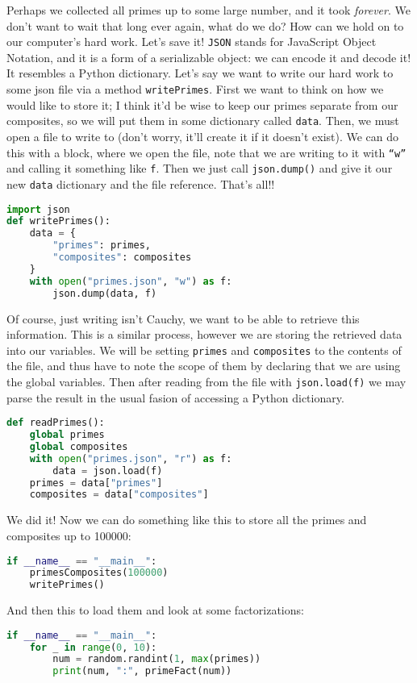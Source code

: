 \documentclass[11pt, twoside, reqno]{book}
\begin{document}
Perhaps we collected all primes up to some large number, and it took \textit{forever}. We don't want to wait that long ever again, what do we do? How can we hold on to our computer's hard work. Let's save it! \texttt{JSON} stands for JavaScript Object Notation, and it is a form of a serializable object: we can encode it and decode it! It resembles a Python dictionary. Let's say we want to write our hard work to some json file via a method \texttt{writePrimes}. First we want to think on how we would like to store it; I think it'd be wise to keep our primes separate from our composites, so we will put them in some dictionary called \texttt{data}. Then, we must open a file to write to (don't worry, it'll create it if it doesn't exist). We can do this with a block, where we open the file, note that we are writing to it with \texttt{``w''} and calling it something like \texttt{f}. Then we just call \texttt{json.dump()} and give it our new \texttt{data} dictionary and the file reference. That's all!!
\begin{lstlisting}[language=Python]
import json
def writePrimes():
    data = {
        "primes": primes,
        "composites": composites
    }
    with open("primes.json", "w") as f:
        json.dump(data, f)
\end{lstlisting}

Of course, just writing isn't Cauchy, we want to be able to retrieve this information. This is a similar process, however we are storing the retrieved data into our variables. We will be setting \texttt{primes} and \texttt{composites} to the contents of the file, and thus have to note the scope of them by declaring that we are using the global variables. Then after reading from the file with \texttt{json.load(f)} we may parse the result in the usual fasion of accessing a Python dictionary.
\begin{lstlisting}[language=Python]
def readPrimes():
    global primes
    global composites
    with open("primes.json", "r") as f:
        data = json.load(f)
    primes = data["primes"]
    composites = data["composites"]
\end{lstlisting}

We did it! Now we can do something like this to store all the primes and composites up to 100000:
\begin{lstlisting}[language=Python]
if __name__ == "__main__":
    primesComposites(100000)
    writePrimes()
\end{lstlisting}

And then this to load them and look at some factorizations:
\begin{lstlisting}[language=Python]
if __name__ == "__main__":
    for _ in range(0, 10):
        num = random.randint(1, max(primes))
        print(num, ":", primeFact(num))
\end{lstlisting}
\end{document}
